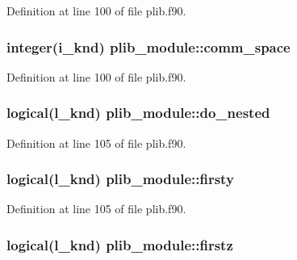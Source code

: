 Definition at line 100 of file plib.\-f90.

\hypertarget{classplib__module_aa5bc6028743a524c4466548e276cb839}{
\subsubsection[{comm\-\_\-space}]{\setlength{\rightskip}{0pt plus 5cm}integer(i\-\_\-knd) plib\-\_\-module\-::comm\-\_\-space}}\label{classplib__module_aa5bc6028743a524c4466548e276cb839}


Definition at line 100 of file plib.\-f90.

\hypertarget{classplib__module_a68a4ebbe262904bf323f37f2e97ee5f2}{
\subsubsection[{do\-\_\-nested}]{\setlength{\rightskip}{0pt plus 5cm}logical(l\-\_\-knd) plib\-\_\-module\-::do\-\_\-nested}}\label{classplib__module_a68a4ebbe262904bf323f37f2e97ee5f2}


Definition at line 105 of file plib.\-f90.

\hypertarget{classplib__module_acacb5f9f63dcc742ef176b99534fe626}{
\subsubsection[{firsty}]{\setlength{\rightskip}{0pt plus 5cm}logical(l\-\_\-knd) plib\-\_\-module\-::firsty}}\label{classplib__module_acacb5f9f63dcc742ef176b99534fe626}


Definition at line 105 of file plib.\-f90.

\hypertarget{classplib__module_a2d791ed6cdd38a29604dcb99a7a556fe}{
\subsubsection[{firstz}]{\setlength{\rightskip}{0pt plus 5cm}logical(l\-\_\-knd) plib\-\_\-module\-::firstz}}\label{classplib__module_a2d791ed6cdd38a29604dcb99a7a556fe}


